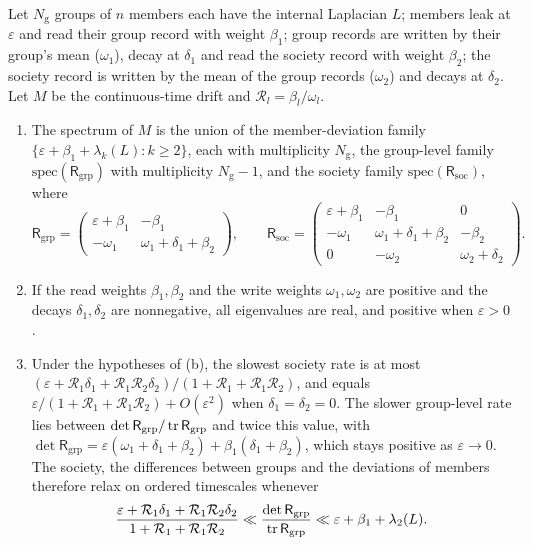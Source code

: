 Let $N_{\mathrm g}$ groups of $n$ members each have the internal Laplacian $L$; members leak at $\varepsilon$ and read their group record with weight $\beta_1$; group records are written by their group's mean ($\omega_1$), decay at $\delta_1$ and read the society record with weight $\beta_2$; the society record is written by the mean of the group records ($\omega_2$) and decays at $\delta_2$. Let $M$ be the continuous-time drift and $\mathcal R_l=\beta_l/\omega_l$.

\begin{theorem}\label{thm:hie-three-levels}
\begin{enumerate}
\item[(a)] The spectrum of $M$ is the union of the member-deviation family $\{\varepsilon+\beta_1+\lambda_k(L):k\ge2\}$, each with multiplicity $N_{\mathrm g}$, the group-level family $\mathrm{spec}(\mathsf R_{\mathrm{grp}})$ with multiplicity $N_{\mathrm g}-1$, and the society family $\mathrm{spec}(\mathsf R_{\mathrm{soc}})$, where
\begin{equation}\label{eq:hie-three}
\mathsf R_{\mathrm{grp}}=\begin{pmatrix}\varepsilon+\beta_1&-\beta_1\\-\omega_1&\omega_1+\delta_1+\beta_2\end{pmatrix},\qquad\mathsf R_{\mathrm{soc}}=\begin{pmatrix}\varepsilon+\beta_1&-\beta_1&0\\-\omega_1&\omega_1+\delta_1+\beta_2&-\beta_2\\0&-\omega_2&\omega_2+\delta_2\end{pmatrix}.
\end{equation}
\item[(b)] If the read weights $\beta_1,\beta_2$ and the write weights $\omega_1,\omega_2$ are positive and the decays $\delta_1,\delta_2$ are nonnegative, all eigenvalues are real, and positive when $\varepsilon>0$.
\item[(c)] Under the hypotheses of (b), the slowest society rate is at most $(\varepsilon+\mathcal R_1\delta_1+\mathcal R_1\mathcal R_2\delta_2)/(1+\mathcal R_1+\mathcal R_1\mathcal R_2)$, and equals $\varepsilon/(1+\mathcal R_1+\mathcal R_1\mathcal R_2)+O(\varepsilon^2)$ when $\delta_1=\delta_2=0$. The slower group-level rate lies between $\det\mathsf R_{\mathrm{grp}}/\operatorname{tr}\mathsf R_{\mathrm{grp}}$ and twice this value, with $\det\mathsf R_{\mathrm{grp}}=\varepsilon(\omega_1+\delta_1+\beta_2)+\beta_1(\delta_1+\beta_2)$, which stays positive as $\varepsilon\to0$. The society, the differences between groups and the deviations of members therefore relax on ordered timescales whenever
\[
\frac{\varepsilon+\mathcal R_1\delta_1+\mathcal R_1\mathcal R_2\delta_2}{1+\mathcal R_1+\mathcal R_1\mathcal R_2}\ll\frac{\det\mathsf R_{\mathrm{grp}}}{\operatorname{tr}\mathsf R_{\mathrm{grp}}}\ll\varepsilon+\beta_1+\lambda_2(L).
\]
\end{enumerate}
\end{theorem}
